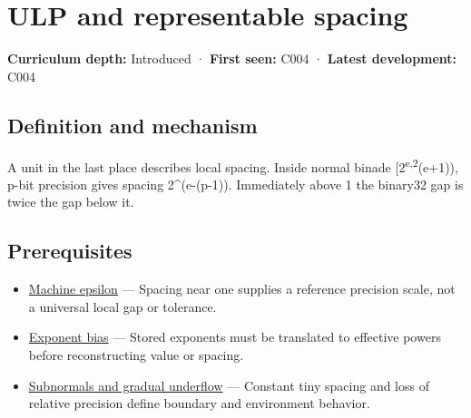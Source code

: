 \hypertarget{appendix-14bab4cab9d4}{}\label{referencestart:appendix-14bab4cab9d4}
\section{ULP and representable spacing}\label{appendix-14bab4cab9d4-ulp-and-representable-spacing}

\hypertarget{appendix-14bab4cab9d4-ulp-and-representable-spacing}{}

\textbf{Curriculum depth:} Introduced · \textbf{First seen:} C004 · \textbf{Latest development:} C004

\begin{allmightroledefinition}

\subsection{Definition and mechanism}\label{appendix-14bab4cab9d4-definition-and-mechanism}

\hypertarget{appendix-14bab4cab9d4-definition-and-mechanism}{}

A unit in the last place describes local spacing. Inside normal binade {[}2\textsuperscript{e,2}(e+1)), p-bit precision gives spacing 2\^{}(e-(p-1)). Immediately above 1 the binary32 gap is twice the gap below it.

\end{allmightroledefinition}

\subsection{Prerequisites}\label{appendix-14bab4cab9d4-prerequisites}

\hypertarget{appendix-14bab4cab9d4-prerequisites}{}

\begin{itemize}
\tightlist
\item
  \hyperref[appendix-390ea641da54]{Machine epsilon} --- Spacing near one supplies a reference precision scale, not a universal local gap or tolerance.
\item
  \hyperref[appendix-2fae058c82e1]{Exponent bias} --- Stored exponents must be translated to effective powers before reconstructing value or spacing.
\item
  \hyperref[appendix-00a6e044c437]{Subnormals and gradual underflow} --- Constant tiny spacing and loss of relative precision define boundary and environment behavior.
\end{itemize}

